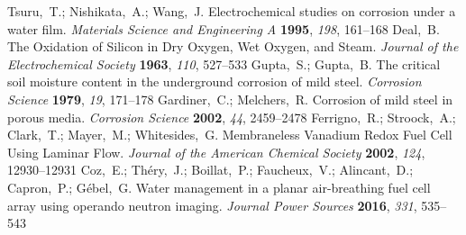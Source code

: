 \documentclass[aps,prl,twocolumn,superscriptaddress,groupedaddress]{revtex4}
\begin{document}
\begin{mcitethebibliography}{88}
{\mcitedefaultendpunct}{\mcitedefaultseppunct}\relax
\EndOfBibitem
{}
Tsuru,~T.; Nishikata,~A.; Wang,~J. Electrochemical studies on corrosion under a
  water film. \emph{Materials Science and Engineering A} \textbf{1995},
  \emph{198}, 161--168\relax
\mciteBstWouldAddEndPuncttrue
\mciteSetBstMidEndSepPunct{\mcitedefaultmidpunct}
{\mcitedefaultendpunct}{\mcitedefaultseppunct}\relax
\EndOfBibitem
{}
Deal,~B. The Oxidation of Silicon in Dry Oxygen, Wet Oxygen, and Steam.
  \emph{Journal of the Electrochemical Society} \textbf{1963}, \emph{110},
  527--533\relax
\mciteBstWouldAddEndPuncttrue
\mciteSetBstMidEndSepPunct{\mcitedefaultmidpunct}
{\mcitedefaultendpunct}{\mcitedefaultseppunct}\relax
\EndOfBibitem
{}
Gupta,~S.; Gupta,~B. The critical soil moisture content in the underground
  corrosion of mild steel. \emph{Corrosion Science} \textbf{1979}, \emph{19},
  171--178\relax
\mciteBstWouldAddEndPuncttrue
\mciteSetBstMidEndSepPunct{\mcitedefaultmidpunct}
{\mcitedefaultendpunct}{\mcitedefaultseppunct}\relax
\EndOfBibitem
{}
Gardiner,~C.; Melchers,~R. Corrosion of mild steel in porous media.
  \emph{Corrosion Science} \textbf{2002}, \emph{44}, 2459--2478\relax
\mciteBstWouldAddEndPuncttrue
\mciteSetBstMidEndSepPunct{\mcitedefaultmidpunct}
{\mcitedefaultendpunct}{\mcitedefaultseppunct}\relax
\EndOfBibitem
{}
Ferrigno,~R.; Stroock,~A.; Clark,~T.; Mayer,~M.; Whitesides,~G. Membraneless
  Vanadium Redox Fuel Cell Using Laminar Flow. \emph{Journal of the American
  Chemical Society} \textbf{2002}, \emph{124}, 12930--12931\relax
\mciteBstWouldAddEndPuncttrue
\mciteSetBstMidEndSepPunct{\mcitedefaultmidpunct}
{\mcitedefaultendpunct}{\mcitedefaultseppunct}\relax
\EndOfBibitem
{}
Coz,~E.; Th{\'e}ry,~J.; Boillat,~P.; Faucheux,~V.; Alincant,~D.; Capron,~P.;
  G{\'e}bel,~G. Water management in a planar air-breathing fuel cell array
  using operando neutron imaging. \emph{Journal Power Sources} \textbf{2016},
  \emph{331}, 535--543\relax
\mciteBstWouldAddEndPuncttrue
\mciteSetBstMidEndSepPunct{\mcitedefaultmidpunct}
{\mcitedefaultendpunct}{\mcitedefaultseppunct}\relax
\EndOfBibitem
{}

\end{mcitethebibliography}
\end{document}
